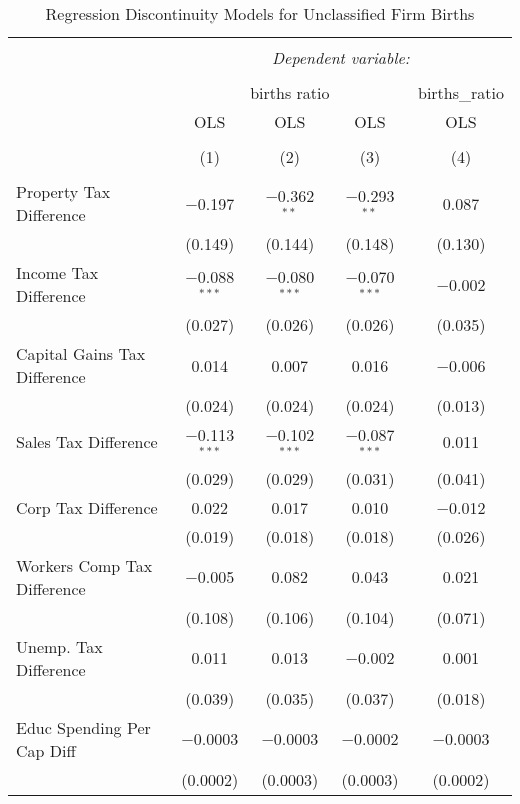 
\begin{table}[!htbp] \centering 
  \caption{Regression Discontinuity Models for  Unclassified Firm Births} 
  \label{99rd} 
\begin{tabular}{@{\extracolsep{5pt}}lcccc} 
\\[-1.8ex]\hline 
\hline \\[-1.8ex] 
 & \multicolumn{4}{c}{\textit{Dependent variable:}} \\ 
\cline{2-5} 
\\[-1.8ex] & \multicolumn{3}{c}{births ratio} & births\_ratio \\ 
 & OLS & OLS & OLS & OLS \\ 
\\[-1.8ex] & (1) & (2) & (3) & (4)\\ 
\hline \\[-1.8ex] 
 Property Tax Difference & $-$0.197 & $-$0.362$^{**}$ & $-$0.293$^{**}$ & 0.087 \\ 
  & (0.149) & (0.144) & (0.148) & (0.130) \\ 
  Income Tax Difference & $-$0.088$^{***}$ & $-$0.080$^{***}$ & $-$0.070$^{***}$ & $-$0.002 \\ 
  & (0.027) & (0.026) & (0.026) & (0.035) \\ 
  Capital Gains Tax Difference & 0.014 & 0.007 & 0.016 & $-$0.006 \\ 
  & (0.024) & (0.024) & (0.024) & (0.013) \\ 
  Sales Tax Difference & $-$0.113$^{***}$ & $-$0.102$^{***}$ & $-$0.087$^{***}$ & 0.011 \\ 
  & (0.029) & (0.029) & (0.031) & (0.041) \\ 
  Corp Tax Difference & 0.022 & 0.017 & 0.010 & $-$0.012 \\ 
  & (0.019) & (0.018) & (0.018) & (0.026) \\ 
  Workers Comp Tax Difference & $-$0.005 & 0.082 & 0.043 & 0.021 \\ 
  & (0.108) & (0.106) & (0.104) & (0.071) \\ 
  Unemp. Tax Difference & 0.011 & 0.013 & $-$0.002 & 0.001 \\ 
  & (0.039) & (0.035) & (0.037) & (0.018) \\ 
  Educ Spending Per Cap Diff & $-$0.0003 & $-$0.0003 & $-$0.0002 & $-$0.0003 \\ 
  & (0.0002) & (0.0003) & (0.0003) & (0.0002) \\ 

\end{tabular}
\end{table}
